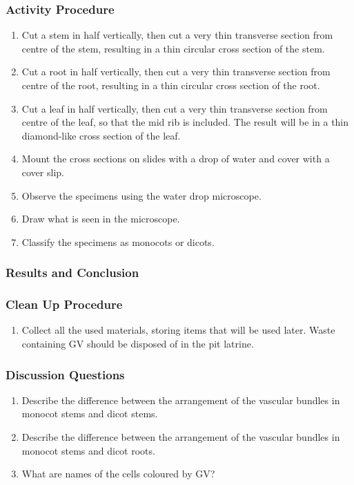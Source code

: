 \subsubsection*{Activity Procedure}
\begin{enumerate}
\item{Cut a stem in half vertically, then cut a very thin transverse section from centre of the stem, resulting in a thin circular cross section of the stem.}
\item{Cut a root in half vertically, then cut a very thin transverse section from centre of the root, resulting in a thin circular cross section of the root.}
\item{Cut a leaf in half vertically, then cut a very thin transverse section from centre of the leaf, so that the mid rib is included. The result will be in a thin diamond-like cross section of the leaf.}
\item{Mount the cross sections on slides with a drop of water and cover with a cover slip.}
\item{Observe the specimens using the water drop microscope.}
\item{Draw what is seen in the microscope.}
\item{Classify the specimens as monocots or dicots.}
\end{enumerate}

\subsubsection*{Results and Conclusion}


\subsubsection*{Clean Up Procedure}
\begin{enumerate}
\item{Collect all the used materials, storing items that will be used later. Waste containing GV should be disposed of in the pit latrine.}
\end{enumerate}

\subsubsection*{Discussion Questions}
\begin{enumerate}
\item{Describe the difference between the arrangement of the vascular bundles in monocot stems and dicot stems.}
\item{Describe the difference between the arrangement of the vascular bundles in monocot stems and dicot roots.}
\item{What are names of the cells coloured by GV?}
\end{enumerate}

